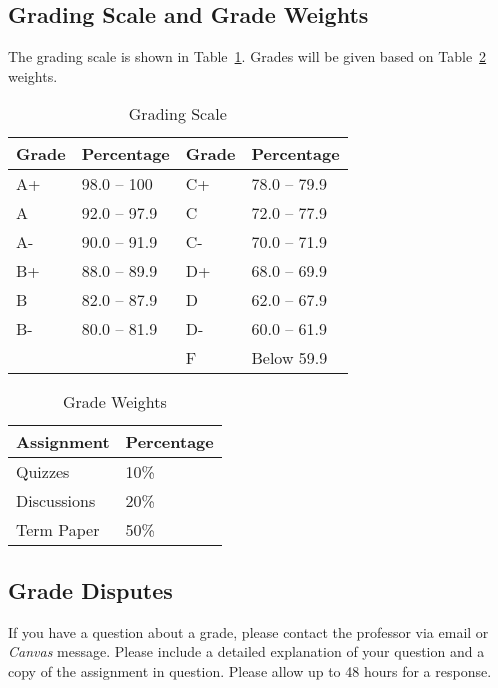 \documentclass[12pt, letterpaper]{article}
\begin{document}
\subsection*{Grading Scale and Grade Weights}  
The grading scale is shown in Table~\ref{tab:grading-scale}. Grades will be given based on Table~\ref{tab:grade-weights} weights.

\begin{table}[ht]
\centering
\caption{Grading Scale}
\begin{tabular}{llll}
\toprule
\textbf{Grade} & \textbf{Percentage} & \textbf{Grade} & \textbf{Percentage} \\ \hline
        A+ & 98.0 -- 100  & C+ & 78.0 -- 79.9 \\
        A  & 92.0 -- 97.9 & C  & 72.0 -- 77.9 \\
        A- & 90.0 -- 91.9 & C- & 70.0 -- 71.9 \\
        B+ & 88.0 -- 89.9 & D+ & 68.0 -- 69.9 \\
        B  & 82.0 -- 87.9 & D  & 62.0 -- 67.9 \\
        B- & 80.0 -- 81.9 & D- & 60.0 -- 61.9 \\
           &              & F  & Below 59.9   \\
\bottomrule
\end{tabular}
\label{tab:grading-scale}
\end{table}

\begin{table}[ht]
    \centering
    \caption{Grade Weights}
    \begin{tabular}{ll}
        \toprule
    \textbf{Assignment} & \textbf{Percentage} \\
    \midrule
    Quizzes & 10\% \\
    Discussions & 20\% \\
    Term Paper & 50\% \\
    \bottomrule
    \end{tabular}
    \label{tab:grade-weights}
    \end{table}

\subsection*{Grade Disputes}

If you have a question about a grade, please contact the professor via email or \emph{Canvas} message. Please include a detailed explanation of your question and a copy of the assignment in question. Please allow up to 48 hours for a response. 
\end{document}
